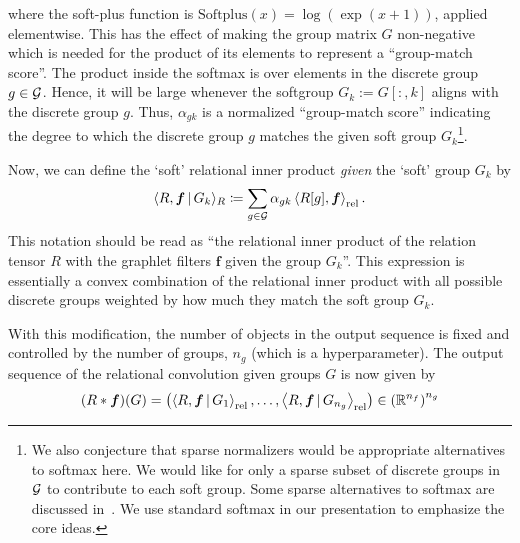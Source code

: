 where the soft-plus function is $\text{Softplus}(x) = \log(\exp(x + 1))$, applied elementwise. This has the effect of making the group matrix $G$ non-negative which is needed for the product of its elements to represent a ``group-match score''. The product inside the softmax is over elements in the discrete group $g \in {\mathcal{G}}$. Hence, it will be large whenever the softgroup $G_k := G[:, k]$ aligns with the discrete group $g$. Thus, $\alpha_{gk}$ is a normalized ``group-match score'' indicating the degree to which the discrete group $g$ matches the given soft group $G_k$\footnote{We also conjecture that sparse normalizers would be appropriate alternatives to softmax here. We would like for only a sparse subset of discrete groups in ${\mathcal{G}}$ to contribute to each soft group. Some sparse alternatives to softmax are discussed in~\citep{lahaControllableSparseAlternatives2018a}. We use standard softmax in our presentation to emphasize the core ideas.}. %

Now, we can define the `soft' relational inner product \textit{given} the `soft' group $G_k$ by
\begin{equation}
    \label{eq:soft_relational_inner_prod}
    \langle R, \boldsymbol{f} \, \vert \, G_k \rangle_R \coloneqq \sum_{g \in {\mathcal{G}}} \alpha_{gk} \left \langle R[g], \boldsymbol{f} \right\rangle_\mathrm{rel}.
\end{equation}
This notation should be read as ``the relational inner product of the relation tensor $R$ with the graphlet filters $\boldsymbol{f}$ given the group $G_k$''. This expression is essentially a convex combination of the relational inner product with all possible discrete groups weighted by how much they match the soft group $G_k$.

With this modification, the number of objects in the output sequence is fixed and controlled by the number of groups, $n_g$ (which is a hyperparameter). The output sequence of the relational convolution given groups $G$ is now given by
\begin{equation}
    \label{eq:soft_relational_convolution_groups}
    (R \ast \bm{f})(G) = \left( \left\langle R, \bm{f} \, \vert \, G_1 \right\rangle_\mathrm{rel}, \ldots, \left\langle R, \bm{f} \, \vert \, G_{n_g} \right\rangle_\mathrm{rel} \right) \in \left(\mathbb{R}^{n_f}\right)^{n_g}
\end{equation}


